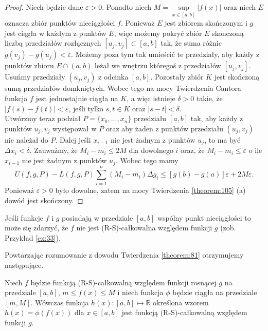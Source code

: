 \documentclass[leqno]{article}
\begin{document}
\begin{justify}
\begin{proof}
    Niech będzie dane $\varepsilon > 0$. Ponadto niech $M = \sup\limits_{x \in [a,b]}|f(x)|$ oraz niech $E$
    oznacza zbiór punktów nieciągłości $f$. Ponieważ $E$ jest zbiorem skończonym i $g$ jest ciągła
    w każdym z punktów $E$, więc możemy pokryć zbiór $E$ skonczoną liczbą przedziałów rozłącznych $[u_j, v_j] \subset [a,b]$ tak,
    że suma różnic $g(v_j) - g(u_j) < \varepsilon$. Możemy poza tym tak umieścić te przedziały, aby każdy z punktów zbioru $E \cap (a,b)$
    leżał we wnętrzu któregoś z przedziałów $[u_j, v_j]$. Usuńmy przedziały $(u_j, v_j)$ z odcinka $[a,b]$. Pozostały zbiór $K$
    jest skończoną sumą przedziałów domkniętych. Wobec tego na mocy Twierdzenia Cantora funkcja $f$ jest jednostajnie ciągła na $K$,
    a więc istnieje $\delta > 0$ takie, że $|f(s) - f(t)| < \varepsilon$, jeśli tylko $s, t \in K$ oraz $|s-t| < \delta$. \\
    Utwórzmy teraz podział $P = \{x_0, \ldots, x_n\}$ przedziału $[a,b]$ tak, aby każdy z punktów $u_j, v_j$ występował w $P$ oraz aby żaden z punktów przedziału $(u_j, v_j)$
    nie należał do $P$. Dalej jeśli $x_{i-1}$ nie jest żadnym z punktów $u_j$, to ma być $\Delta x_i < \delta$. Zauważmy, że 
    $M_i - m_i \leqslant 2M$ dla dowolnego $i$ oraz, że $M_i - m_i \leqslant \varepsilon$ o ile $x_{i-1}$ nie jest żadnym z punktów $u_j$. Wobec tego mamy
    \[
        U(f, g, P) - L(f, g, P) \sum_{i=1}^{n}(M_i - m_i)\Delta g_i \leqslant [g(b) - g(a)]\varepsilon + 2M\varepsilon.
    \]
    Ponieważ $\varepsilon > 0$ było dowolne, zatem na mocy Twierdzenia \ref{theorem:105} (a) dowód jest skończony.
\end{proof}

\begin{uwaga}
    Jeśli funkcje $f$ i $g$ posiadają w przedziale $[a,b]$ wspólny punkt nieciągłości to może się zdarzyć, że $f$ nie jest (R-S)-całkowalna względem funkcji $g$ (zob. Przykład \ref{ex:33}).
\end{uwaga}

Powtarzając rozumowanie z dowodu Twierdzenia \ref{theorem:81} otrzymujemy następujące.

\begin{theorem}
{
    Niech $f$ będzie funkcją (R-S)-całkowalną względem funkcji rosnącej $g$ na przedziale $[a,b]$, $m \leqslant f(x) \leqslant M$ i niech funkcja
    $\phi$ będzie ciągła na przedziale $[m, M]$. Wówczas funkcja $h(x) : [a,b] \mapsto \mathbb{R}$ określona wzorem $h(x) = \phi(f(x))$ dla $x \in [a,b]$
    jest funkcją (R-S)-całkowalną względem funkcji $g$.
}
\end{theorem}


\end{justify}
\end{document}

